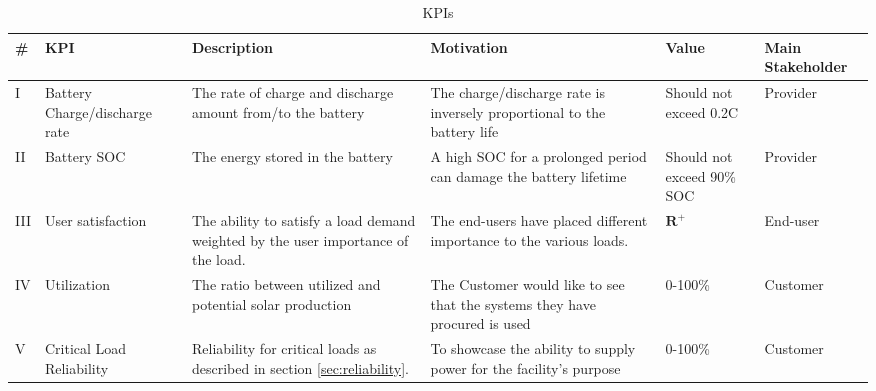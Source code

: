 \begin{table}[h]
    \centering
    \begin{tabular}{|p{0.5cm}|p{2.5cm}|p{3cm}|p{4cm}|p{2.2cm}|p{2cm}|}
        \hline
        \#&\textbf{KPI} & \textbf{Description} & \textbf{Motivation} & \textbf{Value} & \textbf{Main Stakeholder} \\
        \hline
        I&Battery Charge/discharge rate & The rate of charge and discharge amount from/to the battery  & The charge/discharge rate is inversely proportional to the battery life & Should not exceed 0.2C & Provider \\
        \hline
        II&Battery SOC & The energy stored in the battery & A high SOC for a prolonged period can damage the battery lifetime  & Should not exceed 90\% SOC & Provider \\
        \hline
        III&User satisfaction & The ability to satisfy a load demand weighted by the user importance of the load.  & The end-users have placed different importance to the various loads.  & $\mathbf{R}^+$ & End-user  \\
        \hline
        IV&Utilization & The ratio between utilized and potential solar production & The Customer would like to see that the systems they have procured is used  & 0-100\% & Customer \\
        \hline
        V&Critical Load Reliability & Reliability for critical loads as described in section \ref{sec:reliability}. & To showcase the ability to supply power for the facility's purpose & 0-100\% & Customer \\
        \hline
    \end{tabular}
    \caption[KPIs]{KPIs}
    \label{tab:KPI}
\end{table}

